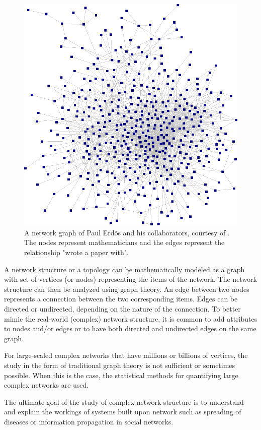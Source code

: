 \documentclass[times, utf8, zavrsni]{fer}
\begin{document}
\begin{figure}[htp]
\centering
\includegraphics[scale = 0.3]{alters2.png}
\caption{A network graph of Paul Erd\~os and his collaborators, courtesy of \cite{krebs}. The nodes represent mathematicians and the edges represent the relationship "wrote a paper with".}
\label{net}
\end{figure}
A network structure or a topology can be mathematically modeled as a graph with set of vertices (or nodes) representing the items of the network. The network structure can then be analyzed using graph theory. An edge between two nodes represents a connection between the two corresponding items. Edges can be directed or undirected, depending  on the nature of the connection.  To better mimic the real-world (complex) network structure, it is common to add attributes to nodes and/or edges or to have both directed and undirected edges on the same graph.

For large-scaled complex networks that have millions or billions of vertices, the study in the form of traditional graph theory is not sufficient or sometimes possible. When this is the case, the statistical methods  for quantifying large complex networks are used. 

The ultimate goal of the study of complex network structure is to understand and explain the workings of systems built upon network such as spreading of diseases or information propagation in social networks.
\end{document}
